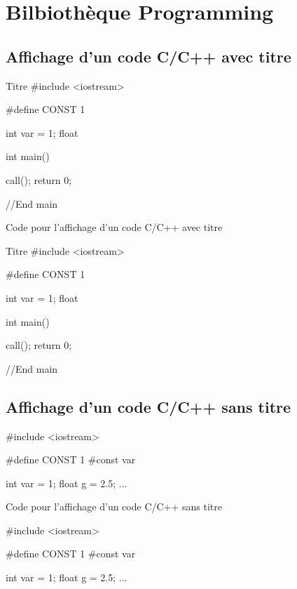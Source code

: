\chapter{Bilbiothèque Programming}


\section{Affichage d'un code C/C++ avec titre}


\begin{Cpp}{Titre}
#include <iostream>

#define CONST 1

int var = 1;
float 

int main() {
  
  call();
  return 0;

}//End main

\end{Cpp}

\begin{Latex}{Code pour l'affichage d'un code C/C++ avec titre}
    \begin{Cpp}{Titre}
        #include <iostream>
        
        #define CONST 1
        
        int var = 1;
        float 
        
        int main() {
          
          call();
          return 0;
        
        }//End main
        
        \end{Cpp}
\end{Latex}

\section{Affichage d'un code C/C++ sans titre}


\begin{Cpp}
#include <iostream>

#define CONST 1 #const var

int var = 1;
float g = 2.5;
...

\end{Cpp}

\begin{Latex}{Code pour l'affichage d'un code C/C++ sans titre}
    \begin{Cpp}
        #include <iostream>
        
        #define CONST 1 #const var
        
        int var = 1;
        float g = 2.5;
        ...
        
        \end{Cpp}
\end{Latex}


